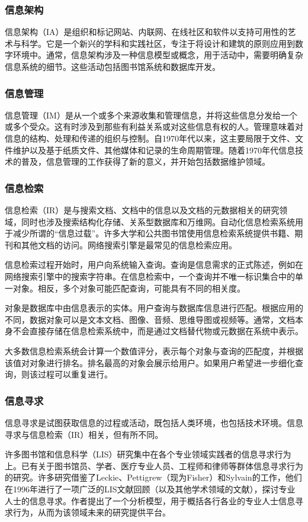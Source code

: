 \subsubsection{信息架构}  
信息架构（IA）是组织和标记网站、内联网、在线社区和软件以支持可用性的艺术与科学。它是一个新兴的学科和实践社区，专注于将设计和建筑的原则应用到数字环境中。通常，信息架构涉及一种信息模型或概念，用于活动中，需要明确复杂信息系统的细节。这些活动包括图书馆系统和数据库开发。
\subsubsection{信息管理} 
信息管理（IM）是从一个或多个来源收集和管理信息，并将这些信息分发给一个或多个受众。这有时涉及到那些有利益关系或对这些信息有权的人。管理意味着对信息的结构、处理和传递的组织与控制。自1970年代以来，这主要局限于文件、文件维护以及基于纸质文件、其他媒体和记录的生命周期管理。随着1970年代信息技术的普及，信息管理的工作获得了新的意义，并开始包括数据维护领域。
\subsubsection{信息检索}  
信息检索（IR）是与搜索文档、文档中的信息以及文档的元数据相关的研究领域，同时也涉及搜索结构化存储、关系型数据库和万维网。自动化信息检索系统用于减少所谓的“信息过载”。许多大学和公共图书馆使用信息检索系统提供书籍、期刊和其他文档的访问。网络搜索引擎是最常见的信息检索应用。

信息检索过程开始时，用户向系统输入查询。查询是信息需求的正式陈述，例如在网络搜索引擎中的搜索字符串。在信息检索中，一个查询并不唯一标识集合中的单一对象。相反，多个对象可能匹配查询，可能具有不同的相关度。

对象是数据库中由信息表示的实体。用户查询与数据库信息进行匹配。根据应用的不同，数据对象可以是文本文档、图像、音频、思维导图或视频等。通常，文档本身不会直接存储在信息检索系统中，而是通过文档替代物或元数据在系统中表示。

大多数信息检索系统会计算一个数值评分，表示每个对象与查询的匹配度，并根据该值对对象进行排名。排名最高的对象会展示给用户。如果用户希望进一步细化查询，则该过程可以重复进行。

\subsubsection{信息寻求}  
信息寻求是试图获取信息的过程或活动，既包括人类环境，也包括技术环境。信息寻求与信息检索（IR）相关，但有所不同。

许多图书馆和信息科学（LIS）研究集中在各个专业领域实践者的信息寻求行为上。已有关于图书馆员、学者、医疗专业人员、工程师和律师等群体信息寻求行为的研究。许多研究借鉴了Leckie、Pettigrew（现为Fisher）和Sylvain的工作，他们在1996年进行了一项广泛的LIS文献回顾（以及其他学术领域的文献），探讨专业人士的信息寻求。作者提出了一个分析模型，用于概括各行各业的专业人士信息寻求行为，从而为该领域未来的研究提供平台。
